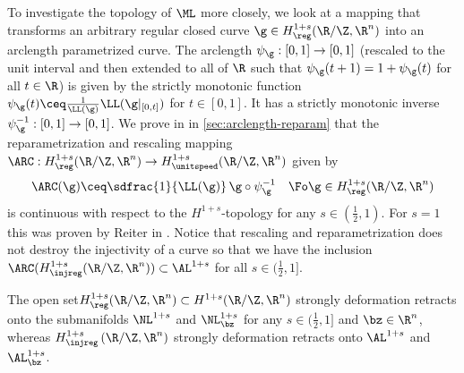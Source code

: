 To investigate the topology of $\ML$ 
more closely,
we look at a mapping that transforms an arbitrary regular closed curve $\g
\in H^{1+s}_\reg(\R/\Z,\R^n)$
into an arclength parametrized curve. The arclength $\psi_\g:
[0,1]\to [0,1]$
(rescaled to the unit interval and then extended to all of $\R$ such that 
$\psi_\g(t+1)=1+\psi_\g(t)$ for all $t\in\R$)  
is given by the strictly monotonic function 
$\psi_\g(t)\ceq\frac1{\LL(\g)}\LL(\g|_{[0,t]})$ for $t\in [0,1]$.
It has a strictly monotonic inverse
$\psi_\g^{-1}:[0,1]
\to [0,1]$.
We prove in  
in \cref{sec:arclength-reparam}
that the reparametrization and rescaling mapping
$\ARC:H^{1+s}_\reg(\R/\Z,\R^n)\to H^{1+s}_\unitspeed(\R/\Z,\R^n)$
given by
\begin{equation}\label{eq:ARC}
	\ARC(\g)
	\ceq
	\sdfrac{1}{\LL(\g)}\,\g\circ \psi_\g^{-1}\quad\Fo \g\in H^{1+s}_\reg(\R/\Z,\R^n)
\end{equation}
is continuous with respect to the $H^{1+s}$-topology for any $s\in (\frac{1}{2},1)$.
For $s=1$ this was proven by Reiter in \cite[Theorem 1.13]{reiter_2009}.
Notice that rescaling and reparametrization does not destroy the injectivity
of a curve so that we have the inclusion
$\ARC(H^{1+s}_\injreg(\R/\Z,\R^n))\subset
\AL^{1+s}$ for all $s\in (\frac{1}{2},1]$.

\begin{theorem}
\label{thm:strong-deformation-ALs}
The open set\newline $H_\reg^{1+s}(\R/\Z,\R^n)\subset H^{1+s}(\R/\Z,\R^n)$ strongly
deformation retracts onto the submanifolds $\NL^{1+s}$ and 
$\NL^{1+s}_\bz$
for any $s\in (\frac{1}{2},1]$ and $\bz\in\R^n$, whereas $ H^{1+s}_{\injreg}\left( \R/\Z,\R^n \right) $ strongly deformation retracts onto $ \AL^{1+s} $ and $ \AL^{1+s}_{\bz} $. 
\end{theorem}

